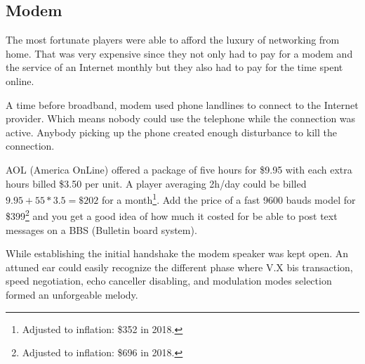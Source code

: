 \subsection{Modem}
The most fortunate players were able to afford the luxury of networking from home. That was very expensive since they not only had to pay for a modem and the service of an Internet monthly but they also had to pay for the time spent online.\\
\par 
A time before broadband, modem used phone landlines to connect to the Internet provider. Which means nobody could use the telephone while the connection was active. Anybody picking up the phone created enough disturbance to kill the connection.\\
\par
AOL (America OnLine) offered a package of five hours for \$9.95 with each extra hours billed \$3.50 per unit. A player averaging 2h/day could be billed $9.95 + 55 * 3.5 = \$202 $ for a month\footnote{Adjusted to inflation: \$352 in 2018.}. Add the price of a fast 9600 bauds model for \$399\footnote{Adjusted to inflation: \$696 in 2018.} and you get a good idea of how much it costed for be able to post text messages on a BBS (Bulletin board system).\\
\par
{}

 While establishing the initial handshake the modem speaker was kept open. An attuned ear could easily recognize the different phase where V.X bis transaction, speed negotiation, echo canceller disabling, and modulation modes selection formed an unforgeable melody.\\
 \par 
{}
\par
 
